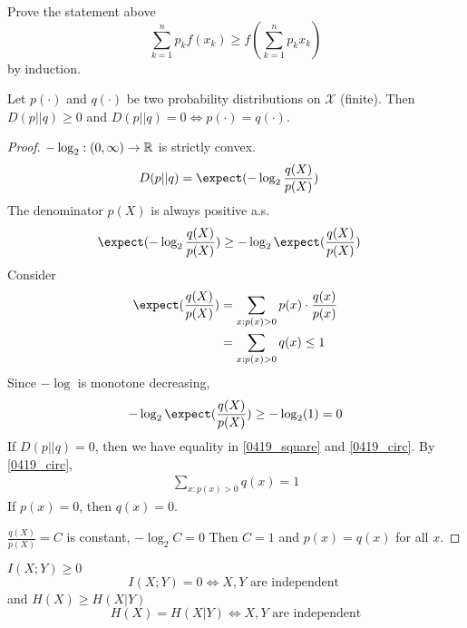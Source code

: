 \documentclass[mfit.tex]{subfiles}
\begin{document}
\begin{ex}
  Prove the statement above
  \[ \sum_{k=1}^n p_k f(x_k) \geq f(\sum_{k=1}^n p_k x_k) \]
  by induction.
\end{ex}

\begin{theorem}
  Let $p(\cdot)$ and $q(\cdot)$ be two probability distributions on $\mathcal{X}$ (finite).
  Then $D(p||q) \geq 0$ and $D(p||q) = 0 \iff p(\cdot) = q(\cdot)$.
\end{theorem}

\begin{proof}
  $- \log_2: (0,\infty) \to \mathbb{R}$ is strictly convex.
  \begin{align*}
    D(p||q) &= \expect( - \log_2 \frac{q(X)}{p(X)}) 
  \end{align*}
  The denominator $p(X)$ is always positive a.s.
  \begin{align} \label{0419_square}
    \expect( - \log_2 \frac{q(X)}{p(X)})  &\geq - \log_2 \expect(\frac{q(X)}{p(X)})
  \end{align}
  Consider
  \begin{align*}
    \expect(\frac{q(X)}{p(X)}) &= \sum_{x: p(x) > 0} p(x) \cdot \frac{q(x)}{p(x)} \\
    &= \sum_{x: p(x) > 0} q(x) \leq 1
  \end{align*}
  Since $- \log$ is monotone decreasing,
  \begin{align*}\label{0419_circ}
    - \log_2 \expect(\frac{q(X)}{p(X)}) \geq - \log_2(1) = 0
  \end{align*}
  If $D(p||q) = 0$, then we have equality in \ref{0419_square} and \ref{0419_circ}.
  By \ref{0419_circ}, 
  \begin{align*}
    \sum_{x: p(x) > 0} q(x) = 1
  \end{align*}
  If $p(x) = 0$, then $q(x) = 0$.
  
  $\frac{q(X)}{p(X)} = C$ is constant, $- \log_2 C = 0$
  Then $C = 1$ and $p(x) = q(x)$ for all $x$.
\end{proof}

\begin{cor}
  $I(X;Y) \geq 0$
  \[ I(X;Y) = 0 \iff X,Y \text{ are independent } \]
  and $H(X) \geq H(X|Y)$
  \[ H(X) = H(X|Y) \iff X,Y \text{ are independent} \]
\end{cor}
\end{document}
